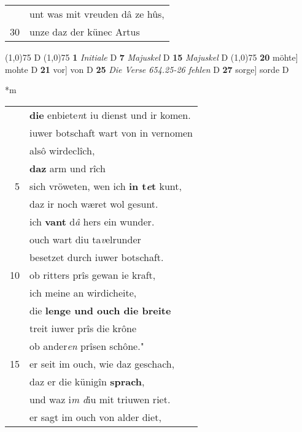\documentclass[8pt,a4paper,notitlepage]{article}
\begin{document}
\begin{table}[ht]
\begin{minipage}[t]{0.5\linewidth}
\begin{tabular}{rl}
 & unt was mit vreuden dâ ze hûs,\\ 
30 & unze daz der künec Artus\\ 
\end{tabular}
\scriptsize
\line(1,0){75} \newline
D \newline
\line(1,0){75} \newline
\textbf{1} \textit{Initiale} D  \textbf{7} \textit{Majuskel} D  \textbf{15} \textit{Majuskel} D  \newline
\line(1,0){75} \newline
\textbf{20} möhte] mohte D \textbf{21} vor] von D \textbf{25} \textit{Die Verse 654.25-26 fehlen} D  \textbf{27} sorge] sorde D \newline
\end{minipage}
\hspace{0.5cm}
\begin{minipage}[t]{0.5\linewidth}
\small
\begin{center}*m
\end{center}
\begin{tabular}{rl}
 & \textbf{die} enbiete\textit{n}t iu dienst und ir komen.\\ 
 & iuwer botschaft wart von in vernomen\\ 
 & alsô wirdeclîch,\\ 
 & \textbf{daz} arm und rîch\\ 
5 & sich vröweten, wen ich \textbf{in t\textit{e}t} kunt,\\ 
 & daz ir noch wæret wol gesunt.\\ 
 & ich \textbf{vant} d\textit{â} hers ein wunder.\\ 
 & ouch wart diu ta\textit{v}elrunder\\ 
 & besetzet durch iuwer botschaft.\\ 
10 & ob ritters prîs gewan ie kraft,\\ 
 & ich meine an wirdicheite,\\ 
 & die \textbf{lenge und ouch die breite}\\ 
 & treit iuwer prîs die krône\\ 
 & ob ander\textit{en} prîsen schône."\\ 
15 & er seit im ouch, wie daz geschach,\\ 
 & daz er die künigîn \textbf{sprach},\\ 
 & und waz i\textit{m d}iu mit triuwen riet.\\ 
 & er sagt im ouch von alder diet,\\ 

\end{tabular}
\end{minipage}
\end{table}
\end{document}
